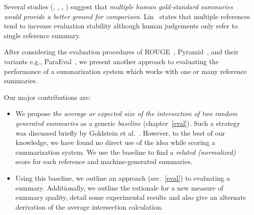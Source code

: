 \documentclass[a4paper]{report}
\begin{document}
\par Several studies (\cite{Salton:1997:ATS:256268.256282}, \cite{384}, \cite{Marcu97fromdiscourse}, \cite{DBLP:conf/acl/ManiM01}) suggest that \emph{multiple human gold-standard summaries would provide a better ground for comparison}. Lin~\cite{Lin:2004a} states that multiple references tend to increase evaluation stability although human judgements only refer to  single reference summary.
\par After considering the evaluation procedures of ROUGE~\cite{Lin04rouge:a}, Pyramid~\cite{DBLP:conf/naacl/NenkovaP04}, and their variants e.g., ParaEval~\cite{export:69253}, we present another approach to evaluating the performance of a summarization system which works with one or many reference summaries. 
\par Our major contributions are:
\begin{itemize}[nolistsep,noitemsep]
\item We propose \emph{the average or expected size of the intersection of two random generated summaries} as a generic \emph{baseline} (chapter~\ref{eval}). Such a strategy was discussed briefly by Goldstein et al.~\cite{Goldstein:1999:STD:312624.312665}. However, to the best of our knowledge, we have found no direct use of the idea while scoring a summarization system. We use the baseline to find a \emph{related (normalized)} score for each reference and machine-generated summaries.
\item Using this baseline, we outline an approach (sec.~\ref{eval}) to evaluating a summary. Additionally, we outline the rationale for a new measure of summary quality, detail some experimental results and also give an alternate derivation of the average intersection calculation.
\end{itemize}
\end{document}
